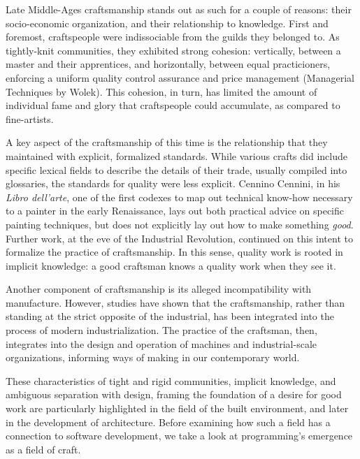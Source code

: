 \documentclass{article}
\begin{document}
Late Middle-Ages craftsmanship stands out as such for a couple of reasons: their socio-economic organization, and their relationship to knowledge. First and foremost, craftspeople were indissociable from the guilds they belonged to\cite{black_guilds_1984}. As tightly-knit communities, they exhibited strong cohesion: vertically, between a master and their apprentices, and horizontally, between equal practicioners, enforcing a uniform quality control assurance and price management (Managerial Techniques by Wolek). This cohesion, in turn, has limited the amount of individual fame and glory that craftspeople could accumulate, as compared to fine-artists\cite{thompson_materials_1956}.

A key aspect of the craftsmanship of this time is the relationship that they maintained with explicit, formalized standards. While various crafts did include specific lexical fields to describe the details of their trade\cite{bassett_craftsman_2008}, usually compiled into glossaries, the standards for quality were less explicit. Cennino Cennini, in his \emph{Libro dell'arte}, one of the first codexes to map out technical know-how necessary to a painter in the early Renaissance, lays out both practical advice on specific painting techniques, but does not explicitly lay out how to make something \emph{good}\cite{cennini_craftsmans_2012}. Further work, at the eve of the Industrial Revolution, continued on this intent to formalize the practice of craftsmanship\cite{pannabecker_diderot_1994}. In this sense, quality work is rooted in implicit knowledge: a good craftsman knows a quality work when they see it\cite{sennett_craftsman_2009}. 

Another component of craftsmanship is its alleged incompatibility with manufacture\cite{ruskin_seven_1920,sturt_wheelwrights_1963}. However, studies have shown that the craftsmanship, rather than standing at the strict opposite of the industrial\cite{jones_reckoning_2016}, has been integrated into the process of modern industrialization. The practice of the craftsman, then, integrates into the design and operation of machines and industrial-scale organizations, informing ways of making in our contemporary world\cite{gordon_who_1988,mcgee_craftsmanship_1999}.

These characteristics of tight and rigid communities, implicit knowledge, and ambiguous separation with design, framing the foundation of a desire for good work are particularly highlighted in the field of the built environment, and later in the development of architecture. Before examining how such a field has a connection to software development, we take a look at programming's emergence as a field of craft.
\end{document}
